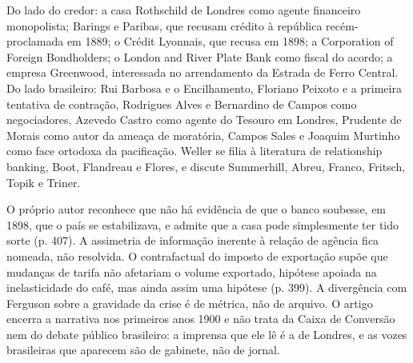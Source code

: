 
Do lado do credor: a casa Rothschild de Londres como agente financeiro
monopolista; Barings e Paribas, que recusam crédito à república recém-proclamada
em 1889; o Crédit Lyonnais, que recusa em 1898; a Corporation of Foreign
Bondholders; o London and River Plate Bank como fiscal do acordo; a empresa
Greenwood, interessada no arrendamento da Estrada de Ferro Central. Do lado
brasileiro: Rui Barbosa e o Encilhamento, Floriano Peixoto e a primeira
tentativa de contração, Rodrigues Alves e Bernardino de Campos como
negociadores, Azevedo Castro como agente do Tesouro em Londres, Prudente de
Morais como autor da ameaça de moratória, Campos Sales e Joaquim Murtinho como
face ortodoxa da pacificação. Weller se filia à literatura de relationship
banking, Boot, Flandreau e Flores, e discute Summerhill, Abreu, Franco, Fritsch,
Topik e Triner.



O próprio autor reconhece que não há evidência de que o banco soubesse, em 1898,
que o país se estabilizava, e admite que a casa pode simplesmente ter tido sorte
(p. 407). A assimetria de informação inerente à relação de agência fica nomeada,
não resolvida. O contrafactual do imposto de exportação supõe que mudanças de
tarifa não afetariam o volume exportado, hipótese apoiada na inelasticidade do
café, mas ainda assim uma hipótese (p. 399). A divergência com Ferguson sobre a
gravidade da crise é de métrica, não de arquivo. O artigo encerra a narrativa
nos primeiros anos 1900 e não trata da Caixa de Conversão nem do debate público
brasileiro: a imprensa que ele lê é a de Londres, e as vozes brasileiras que
aparecem são de gabinete, não de jornal.

